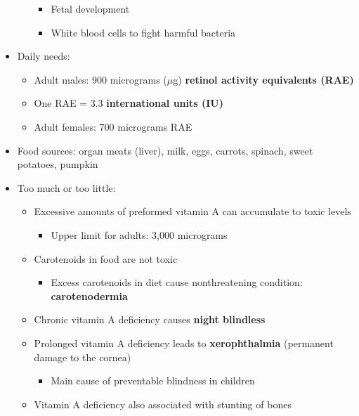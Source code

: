 \documentclass[12pt]{article}
\begin{document}
\begin{itemize}
\begin{itemize}
\begin{itemize}
                                \item Fetal development
                                \item White blood cells to fight harmful bacteria
                            \end{itemize}
                    \end{itemize}
                \item Daily needs:
                    \begin{itemize}
                        \item Adult males: 900 micrograms ($\mu$g) \textbf{retinol activity equivalents (RAE)}
                        \item One RAE = 3.3 \textbf{international units (IU)}
                        \item Adult females: 700 micrograms RAE
                    \end{itemize}
                \item Food sources: organ meats (liver), milk, eggs, carrots, spinach, sweet potatoes, pumpkin
                \item Too much or too little:
                    \begin{itemize}
                        \item Excessive amounts of preformed vitamin A can accumulate to toxic levels
                            \begin{itemize}
                                \item Upper limit for adults: 3,000 micrograms
                            \end{itemize}
                        \item Carotenoids in food are not toxic
                            \begin{itemize}
                                \item Excess carotenoids in diet cause nonthreatening condition: \textbf{carotenodermia}
                            \end{itemize}
                        \item Chronic vitamin A deficiency causes \textbf{night blindless}
                        \item Prolonged vitamin A deficiency leads to \textbf{xerophthalmia} (permanent damage to the cornea)
                            \begin{itemize}
                                \item Main cause of preventable blindness in children
                            \end{itemize}
                        \item Vitamin A deficiency also associated with stunting of bones
                    \end{itemize}
            \end{itemize}
            
\end{document}
